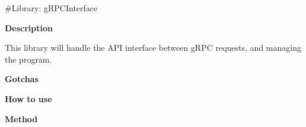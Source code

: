 \#\+Library\+: g\+R\+P\+C\+Interface

{\bfseries{Description}}

This library will handle the A\+PI interface between g\+R\+PC requests, and managing the program.

{\bfseries{Gotchas}}

{\bfseries{How to use}}

{\bfseries{Method}} 